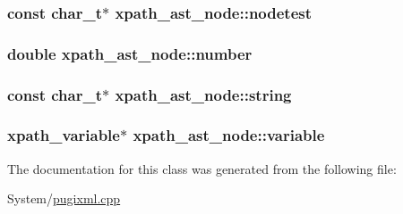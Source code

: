 \hypertarget{classxpath__ast__node_a50f44079b7f3e399e23488f520a34f17}{
\subsubsection[{nodetest}]{\setlength{\rightskip}{0pt plus 5cm}const char\-\_\-t$\ast$ xpath\-\_\-ast\-\_\-node\-::nodetest}}\label{classxpath__ast__node_a50f44079b7f3e399e23488f520a34f17}
\hypertarget{classxpath__ast__node_a73870c7a83538e525398855b26154484}{
\subsubsection[{number}]{\setlength{\rightskip}{0pt plus 5cm}double xpath\-\_\-ast\-\_\-node\-::number}}\label{classxpath__ast__node_a73870c7a83538e525398855b26154484}
\hypertarget{classxpath__ast__node_a187822d65799b3bbccd8d0522bd14e59}{
\subsubsection[{string}]{\setlength{\rightskip}{0pt plus 5cm}const char\-\_\-t$\ast$ xpath\-\_\-ast\-\_\-node\-::string}}\label{classxpath__ast__node_a187822d65799b3bbccd8d0522bd14e59}
\hypertarget{classxpath__ast__node_a0fd3b0d8f930836105eeff6e2efa5ad3}{
\subsubsection[{variable}]{\setlength{\rightskip}{0pt plus 5cm}xpath\-\_\-variable$\ast$ xpath\-\_\-ast\-\_\-node\-::variable}}\label{classxpath__ast__node_a0fd3b0d8f930836105eeff6e2efa5ad3}


The documentation for this class was generated from the following file\-:\begin{DoxyCompactItemize}
\item 
System/\hyperlink{pugixml_8cpp}{pugixml.\-cpp}\end{DoxyCompactItemize}
